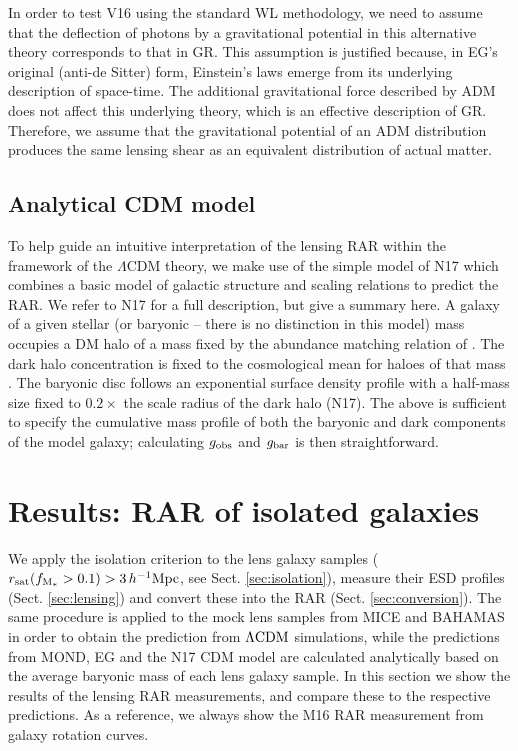 \documentclass[usenatbib]{mnras}
\newcommand{\hMpc}{\, h^{-1}{\rm{Mpc}} }
\newcommand{\lcdm}{{\rm \Lambda CDM}}
\newcommand{\un}[1]{_{\rm #1}}
\begin{document}
In order to test V16 using the standard WL methodology, we need to assume that the deflection of photons by a gravitational potential in this alternative theory corresponds to that in GR. This assumption is justified because, in EG's original (anti-de Sitter) form, Einstein's laws emerge from its underlying description of space-time. The additional gravitational force described by ADM does not affect this underlying theory, which is an effective description of GR. Therefore, we assume that the gravitational potential of an ADM distribution produces the same lensing shear as an equivalent distribution of actual matter.

\subsection{Analytical CDM model}
\label{sec:analytical}

To help guide an intuitive interpretation of the lensing RAR within the framework of the $\Lambda$CDM theory, we make use of the simple model of N17 which combines a basic model of galactic structure and scaling relations to predict the RAR. We refer to N17 for a full description, but give a summary here. A galaxy of a given stellar (or baryonic -- there is no distinction in this model) mass occupies a DM halo of a mass fixed by the abundance matching relation of \citet{behroozi2013}. The dark halo concentration is fixed to the cosmological mean for haloes of that mass \citep{ludlow2014}. The baryonic disc follows an exponential surface density profile with a half-mass size fixed to $0.2\times$ the scale radius of the dark halo (N17). The above is sufficient to specify the cumulative mass profile of both the baryonic and dark components of the model galaxy; calculating $g\un{obs}$ and $g\un{bar}$ is then straightforward.

\section{Results: RAR of isolated galaxies}
\label{sec:results}

We apply the isolation criterion to the lens galaxy samples (\mbox{$r\un{sat}(f\un{M_*}>0.1)>3\hMpc$}, see Sect. \ref{sec:isolation}), measure their ESD profiles (Sect. \ref{sec:lensing}) and convert these into the RAR (Sect. \ref{sec:conversion}). The same procedure is applied to the mock lens samples from MICE and BAHAMAS in order to obtain the prediction from $\lcdm$ simulations, while the predictions from MOND, EG and the N17 CDM model are calculated analytically based on the average baryonic mass of each lens galaxy sample. In this section we show the results of the lensing RAR measurements, and compare these to the respective predictions. As a reference, we always show the M16 RAR measurement from galaxy rotation curves.
\end{document}
